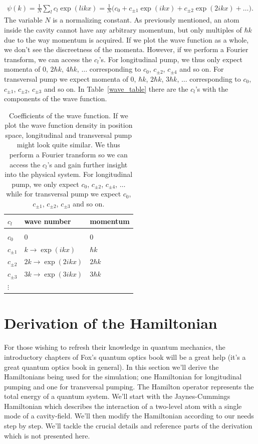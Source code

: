 \begin{align}
\psi(k) = \frac{1}{N} \sum_{l} c_l \exp(likx) = \frac{1}{N} \Big( c_0 + c_{\pm 1} \exp(ikx) + c_{\pm 2} \exp(2ikx) + \dots \Big) .
\end{align}The variable $N$ is a normalizing constant. As previously mentioned, an atom inside the cavity cannot have any arbitrary momentum, but only multiples of $\hbar k$ due to the way momentum is acquired. If we plot the wave function as a whole, we don't see the discreetness of the momenta. However, if we perform a Fourier transform, we can access the $c_l$'s. For longitudinal pump, we thus only expect momenta of 0, $2 \hbar k$, $4 \hbar k$, $\dots$ corresponding to $c_0$, $c_{\pm 2}$, $c_{\pm 4}$ and so on. For transversal pump we expect momenta of 0, $\hbar k$, $2 \hbar k$, $3 \hbar k$, $\dots$ corresponding to $c_0$, $c_{\pm 1}$, $c_{\pm 2}$, $c_{\pm 3}$ and so on. In Table~\ref{wave_table} there are the $c_l$'s with the components of the wave function.

\begin{table}[!htb]
\centering
\begin{tabular}{lll}
$c_l$    & wave number & momentum    \\
\hline \\
$c_0$    & 0           & 0           \\
$c_{\pm 1}$    & $k \rightarrow \exp(ikx)$         & $\hbar k$   \\
$c_{\pm 2}$    & $2k \rightarrow \exp(2ikx)$        & $2 \hbar k$ \\
$c_{\pm 3}$    & $3k \rightarrow \exp(3ikx)$        & $3 \hbar k$ \\
$\vdots$ &             &            
\end{tabular}
\caption{Coefficients of the wave function. If we plot the wave function density in position space, longitudinal and transversal pump might look quite similar. We thus perform a Fourier transform so we can access the $c_l$'s and gain further insight into the physical system. For longitudinal pump, we only expect $c_0$, $c_{\pm 2}$, $c_{\pm 4}$, $\dots$ while for transversal pump we expect $c_0$, $c_{\pm 1}$, $c_{\pm 2}$, $c_{\pm 3}$ and so on.}
\end{table}
\label{wave_table}
\FloatBarrier



\section{Derivation of the Hamiltonian}
For those wishing to refresh their knowledge in quantum mechanics, the introductory chapters of Fox's quantum optics book will be a great help \cite{fox} (it's a great quantum optics book in general). In this section we'll derive the Hamiltonians being used for the simulation; one Hamiltonian for longitudinal pumping and one for transversal pumping. The Hamilton operator represents the total energy of a quantum system. We'll start with the Jaynes-Cummings Hamiltonian which describes the interaction of a two-level atom with a single mode of a cavity-field. We'll then modify the Hamiltonian according to our needs step by step. We'll tackle the crucial details and reference parts of the derivation which is not presented here.

